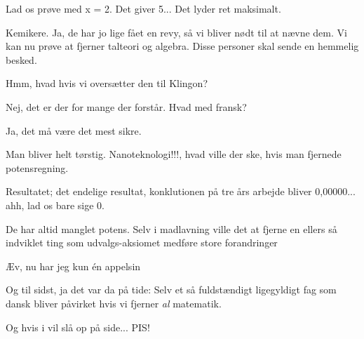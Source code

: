 \documentclass[a4paper,11pt]{article}
\begin{document}
\begin{sketch}
 Lad os prøve med x = 2. Det giver 5... Det lyder ret maksimalt.

 Kemikere. Ja, de har jo lige fået en revy, så vi bliver nødt til at nævne dem. Vi kan nu prøve at fjerner talteori og algebra. Disse personer skal sende en hemmelig besked.


 Hmm, hvad hvis vi oversætter den til Klingon?

 Nej, det er der for mange der forstår. Hvad med fransk?

 Ja, det må være det mest sikre.

 Man bliver helt tørstig. Nanoteknologi!!!, hvad ville der ske, hvis man fjernede potensregning.

 Resultatet; det endelige resultat, konklutionen på tre års arbejde bliver 0,00000... ahh, lad os bare sige 0.

 De har altid manglet potens. Selv i madlavning ville det at fjerne en ellers så indviklet ting som udvalgs-aksiomet medføre store forandringer


 Æv, nu har jeg kun én appelsin

 Og til sidst, ja det var da på tide: Selv et så fuldstændigt ligegyldigt fag som dansk bliver påvirket hvis vi fjerner \emph{al} matematik.


 Og hvis i vil slå op på side... PIS!
\end{sketch}
\end{document}
